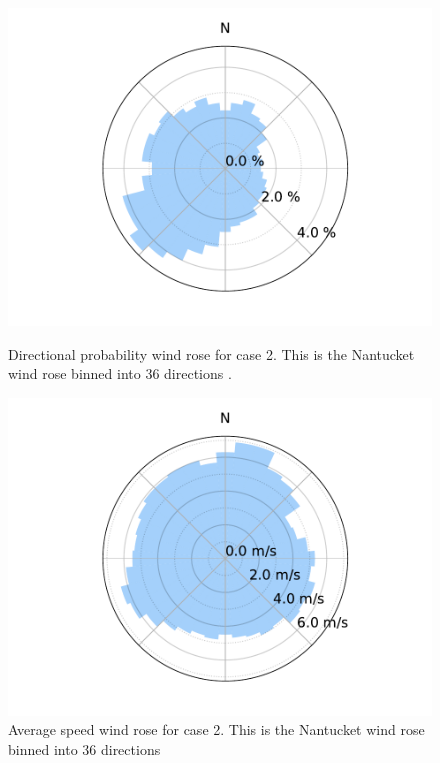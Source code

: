 \documentclass{jpconf}
\begin{document}
\begin{figure}[h!]
	\centering
	\begin{minipage}[t]{18pc}
		\centering
		\includegraphics[width=\textwidth, trim={1.5cm 0cm 1.5cm 0cm}, clip]{final_images/windroses/freqwindrose_36_dir.pdf}
		\caption{Directional probability wind rose for case 2. This is the Nantucket wind rose binned into 36 directions \cite{wrcc2017}.}
		\label{fig:freqwindrose_36dir}
	\end{minipage} \hspace{1pc}%
	\begin{minipage}[t]{18pc}
		\centering
		\includegraphics[width=\textwidth, trim={1.5cm, 0cm, 1.5cm, 0cm}, clip]{final_images/windroses/speedwindrose_36_dir.pdf}
		\caption{Average speed wind rose for case 2. This is the Nantucket wind rose binned into 36 directions \cite{wrcc2017}}
		\label{fig:speedwindrose_36dir}
	\end{minipage}
\end{figure}
\end{document}
